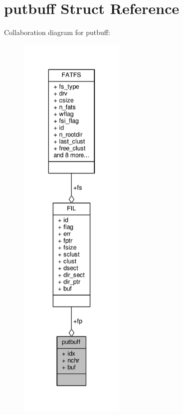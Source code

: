\hypertarget{structputbuff}{\section{putbuff Struct Reference}
\label{structputbuff}
}


Collaboration diagram for putbuff\+:
\nopagebreak
\begin{figure}[H]
\begin{center}
\leavevmode
\includegraphics[height=550pt]{structputbuff__coll__graph}
\end{center}
\end{figure}

